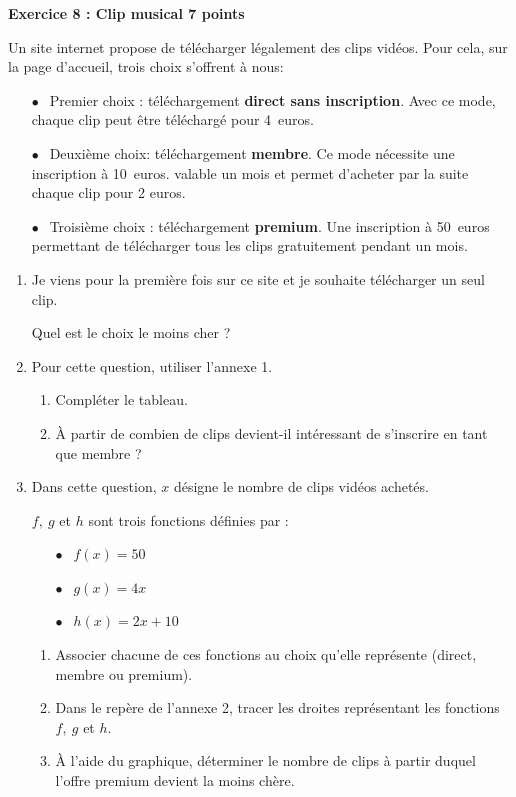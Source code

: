 \textbf{Exercice 8 : Clip musical \hfill 7 points}

\medskip

Un site internet propose de télécharger légalement des clips vidéos. Pour cela, sur la page d'accueil, trois choix s'offrent à nous:

\setlength\parindent{8mm}
\begin{itemize}
\item[$\bullet~~$] Premier choix : téléchargement \textbf{direct sans inscription}. Avec ce mode, chaque clip peut être téléchargé pour 4~euros.
\item[$\bullet~~$] Deuxième choix: téléchargement \textbf{membre}. Ce mode nécessite une inscription à 10~euros.
valable un mois et permet d'acheter par la suite chaque clip pour 2 euros.
\item[$\bullet~~$] Troisième choix : téléchargement \textbf{premium}. Une inscription à 50~euros permettant de télécharger tous les clips gratuitement pendant un mois.
\end{itemize}
\setlength\parindent{0mm}

\medskip

\begin{enumerate}
\item Je viens pour la première fois sur ce site et je souhaite télécharger un seul clip.

Quel est le choix le moins cher ?
\item Pour cette question, utiliser l'annexe 1.
	\begin{enumerate}
		\item Compléter le tableau.
		\item À partir de combien de clips devient-il intéressant de s'inscrire en tant que membre ?
	\end{enumerate}
\item Dans cette question, $x$ désigne le nombre de clips vidéos achetés.
	
$f,\: g$ et $h$ sont trois fonctions définies par :
	
\setlength\parindent{8mm}
\begin{itemize}
\item[$\bullet~~$]$f(x) = 50$
\item[$\bullet~~$]$g(x) = 4x$
\item[$\bullet~~$]$h(x) = 2x + 10$
\end{itemize}
\setlength\parindent{0mm}

	\begin{enumerate}
		\item Associer chacune de ces fonctions au choix qu'elle représente (direct, membre ou premium).
		\item Dans le repère de l'annexe 2, tracer les droites représentant les fonctions $f,\: g$ et $h$.
		\item À l'aide du graphique, déterminer le nombre de clips à partir duquel l'offre premium devient la moins chère.
	\end{enumerate}
\end{enumerate}

\vspace{0,5cm}

